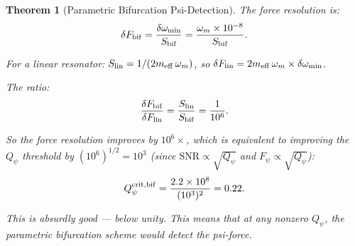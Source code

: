 \documentclass[11pt]{article}
\newcommand{\ee}[1]{\times 10^{#1}}
\newcommand{\Qpsi}{Q_\psi}
\newcommand{\SNR}{\mathrm{SNR}}
\newtheorem{theorem}{Theorem}[section]
\theoremstyle{definition}
\theoremstyle{remark}
\begin{document}
\begin{theorem}[Parametric Bifurcation Psi-Detection]
The force resolution is:
\begin{equation}
\delta F_{\rm bif} = \frac{\delta\omega_{\rm min}}{S_{\rm bif}}
= \frac{\omega_m \times 10^{-8}}{S_{\rm bif}}.
\end{equation}

For a linear resonator: $S_{\rm lin} = 1/(2 m_{\rm eff}\,\omega_m)$,
so $\delta F_{\rm lin} = 2 m_{\rm eff}\,\omega_m \times \delta\omega_{\rm min}$.

The ratio:
\begin{equation}
\frac{\delta F_{\rm bif}}{\delta F_{\rm lin}}
= \frac{S_{\rm lin}}{S_{\rm bif}} = \frac{1}{10^6}.
\end{equation}

So the force resolution improves by $10^6\times$, which is
equivalent to improving the $\Qpsi$ threshold by $(10^6)^{1/2}
= 10^3$ (since $\SNR \propto \sqrt{\Qpsi}$ and $F_\psi \propto
\sqrt{\Qpsi}$):
\begin{equation}
\Qpsi^{\rm crit, bif} = \frac{2.2\ee{8}}{(10^3)^2} = 0.22.
\end{equation}

This is absurdly good --- below unity. This means that at \emph{any}
nonzero $\Qpsi$, the parametric bifurcation scheme would detect
the psi-force.
\end{theorem}
\end{document}
